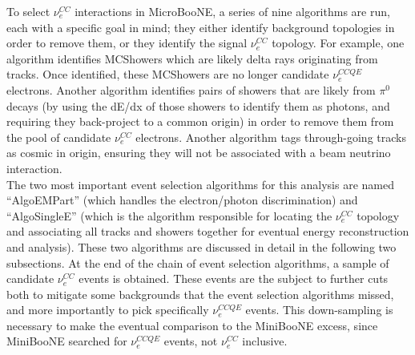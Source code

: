 To select $\nu_e^{CC}$ interactions in MicroBooNE, a series of nine algorithms are run, each with a specific goal in mind; they either identify background topologies in order to remove them, or they identify the signal $\nu_e^{CC}$ topology. For example, one algorithm identifies {\sc MCShowers} which are likely delta rays originating from tracks. Once identified, these {\sc MCShowers} are no longer candidate $\nu_e^{CCQE}$ electrons. Another algorithm identifies pairs of showers that are likely from $\pi^0$ decays (by using the dE/dx of those showers to identify them as photons, and requiring they back-project to a common origin) in order to remove them from the pool of candidate $\nu_e^{CC}$ electrons. Another algorithm tags through-going tracks as cosmic in origin, ensuring they will not be associated with a beam neutrino interaction.\\

The two most important event selection algorithms for this analysis are named ``AlgoEMPart'' (which handles the electron/photon discrimination) and ``AlgoSingleE'' (which is the algorithm responsible for locating the $\nu_e^{CC}$ topology and associating all tracks and showers together for eventual energy reconstruction and analysis). These two algorithms are discussed in detail in the following two subsections. At the end of the chain of event selection algorithms, a sample of candidate $\nu_e^{CC}$ events is obtained. These events are the subject to further cuts both to mitigate some backgrounds that the event selection algorithms missed, and more importantly to pick specifically $\nu_e^{CCQE}$ events. This down-sampling is necessary to make the eventual comparison to the MiniBooNE excess, since MiniBooNE searched for $\nu_e^{CCQE}$ events, not $\nu_e^{CC}$ inclusive.


